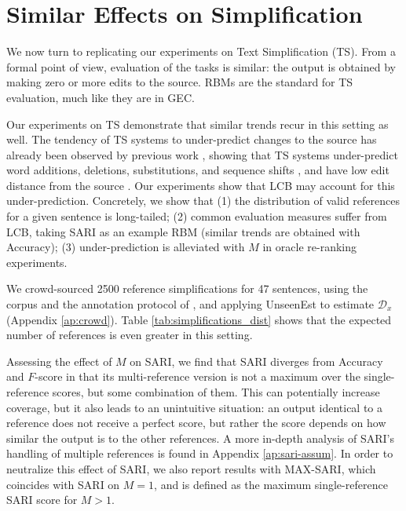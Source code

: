 \documentclass[11pt, a4paper]{article}
\begin{document}
\section{Similar Effects on Simplification}\label{sec:simplification}

We now turn to replicating our experiments on Text Simplification (TS). 
From a formal point of view, evaluation of the tasks is similar:
the output is obtained by making zero or more edits to the source. RBMs are the standard for TS evaluation,
much like they are in GEC.

Our experiments on TS demonstrate that similar trends recur in this setting as well. 
The tendency of TS systems to under-predict changes to the source 
has already been observed by previous work \cite{alvamanchego-EtAl:2017:I17-1}, 
showing that TS systems under-predict word additions, deletions,
substitutions, and sequence shifts \cite{zhang-lapata:2017:EMNLP2017},
and have low edit distance from the source \cite{narayan-gardent:2016:INLG}.
Our experiments show that LCB may account for this under-prediction. Concretely, we show that
(1) the distribution of valid references for a given sentence is long-tailed; 
(2) common evaluation measures suffer from LCB, taking SARI \cite{Xu-EtAl:2016:TACL} 
    as an example RBM (similar trends are obtained with Accuracy); 
(3) under-prediction is alleviated with $M$ in oracle re-ranking experiments.

We crowd-sourced 2500 reference simplifications for 47 sentences, using the corpus and the annotation protocol of 
, and applying {\sc UnseenEst} to estimate $\mathcal{D}_x$ (Appendix  \ref{ap:crowd}).
Table \ref{tab:simplifications_dist} shows that the expected number of references is even greater in this setting. 

Assessing the effect of $M$ on SARI, we find that SARI diverges from Accuracy and $F$-score
in that its multi-reference version is not a maximum over the single-reference scores, but some combination of them.
This can potentially increase coverage, but it also leads to an unintuitive situation: an output 
identical to a reference does not receive a perfect score, but rather the score depends on how similar the output is to the other
references. A more in-depth analysis of SARI's handling of multiple references is found in Appendix \ref{ap:sari-assum}.
In order to neutralize this effect of SARI, we also report results with MAX-SARI, which coincides with SARI on $M=1$, 
and is defined as the maximum single-reference SARI score for $M>1$.
\end{document}

